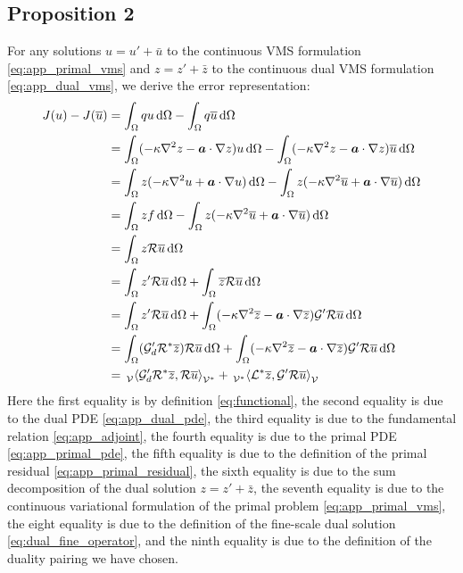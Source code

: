 \subsection{Proposition 2}
For any solutions $u = u' + \bar{u}$ to the continuous VMS
formulation \eqref{eq:app_primal_vms} and $z = z' + \bar{z}$ to the
continuous dual VMS formulation \eqref{eq:app_dual_vms}, we
derive the error representation:
%
\begin{gather*}
\begin{aligned}
J(u) - J(\overline{u})
&=
\int_{\Omega} q u \, \text{d} \Omega -
\int_{\Omega} q \overline{u} \, \text{d} \Omega \\
&=
\int_{\Omega} (-\kappa \nabla^2 {z} - \boldsymbol{a} \cdot \nabla {z}) u \, \text{d} \Omega -
\int_{\Omega} (-\kappa \nabla^2 {z} - \boldsymbol{a} \cdot \nabla {z}) \overline{u} \, \text{d} \Omega \\
&=
\int_{\Omega} z (-\kappa \nabla^2 {u} + \boldsymbol{a} \cdot \nabla {u}) \, \text{d} \Omega -
\int_{\Omega} z (-\kappa \nabla^2 {\overline{u}} + \boldsymbol{a} \cdot \nabla {\overline{u}}) \, \text{d} \Omega \\
&=
\int_{\Omega} z f \, \text{d} \Omega -
\int_{\Omega} z (-\kappa \nabla^2 {\overline{u}} + \boldsymbol{a} \cdot \nabla {\overline{u}}) \, \text{d} \Omega \\
&=
\int_{\Omega} z \mathcal{R} \overline{u} \, \text{d} \Omega \\
&=
\int_{\Omega} z' \mathcal{R} \overline{u} \, \text{d} \Omega +
\int_{\Omega} \overline{z} \mathcal{R} \overline{u} \, \text{d} \Omega \\
&=
\int_{\Omega} z' \mathcal{R} \overline{u} \, \text{d} \Omega +
\int_{\Omega} (-\kappa \nabla^2 {\overline{z}} - \boldsymbol{a} \cdot \nabla {\overline{z}}) \mathcal{G}' \mathcal{R} \overline{u} \, \text{d} \Omega \\
&=
\int_{\Omega} (\mathcal{G}'_d \mathcal{R}^* \overline{z}) \mathcal{R} \overline{u} \, \text{d} \Omega +
\int_{\Omega} (-\kappa \nabla^2 {\overline{z}} - \boldsymbol{a} \cdot \nabla {\overline{z}}) \mathcal{G}' \mathcal{R} \overline{u} \, \text{d} \Omega \\
&=
\,{}_{\mathcal{V}}^{}\!\left< {\mathcal{G}'_d \mathcal{R}^* \overline{z}}, {\mathcal{R} \overline{u}} \right>_{\mathcal{V}^*} +
\,{}_{\mathcal{V}^*}^{}\!\left< {\mathcal{L}^* \overline{z}}, {\mathcal{G}' \mathcal{R} \overline{u}} \right>_{\mathcal{V}}
\end{aligned}
\label{eq:app_error_cont_2}
\end{gather*}
Here the first equality is by definition \eqref{eq:functional},
the second equality is due to the dual PDE \eqref{eq:app_dual_pde},
the third equality is due to the fundamental relation
\eqref{eq:app_adjoint}, the fourth equality is due to the primal
PDE \eqref{eq:app_primal_pde}, the fifth equality is due to the
definition of the primal residual \eqref{eq:app_primal_residual},
the sixth equality is due to the sum decomposition of the
dual solution $z = z' + \bar{z}$, the seventh equality is due
to the continuous variational formulation of the primal problem
\eqref{eq:app_primal_vms}, the eight equality is due to
the definition of the fine-scale dual solution
\eqref{eq:dual_fine_operator}, and the ninth equality
is due to the definition of the duality pairing we have chosen.

